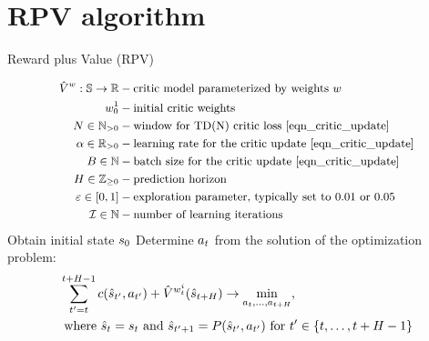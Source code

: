 \documentclass[12pt,twoside]{../../mitthesis}
\begin{document}
\section*{RPV algorithm}
\begin{algorithm}
    \caption{Reward plus Value (RPV)}
    \label{alg:my-alg}
    \begin{algorithmic}[1]
    \begin{equation*}
        \small
        \begin{aligned}
            \hat{V}^w : \mathbb S \to {\mathbb{R}} &- \text{critic model parameterized by weights $w$} \\
            w_0^1 & - \text{initial critic weights} \\
            N \in {\mathbb{N}}_{>0} & - \text{window for TD(N) critic loss \eqref{eqn_critic_update}} \\
            \alpha \in {\mathbb{R}}_{>0}& - \text{learning rate for the critic update \eqref{eqn_critic_update}} \\
            B \in {\mathbb{N}} & - \text{batch size for the critic update \eqref{eqn_critic_update}} \\
            H \in {\mathbb{Z}}_{\geq 0} & - \text{prediction horizon} \\
            \varepsilon \in [0, 1] & - \text{exploration parameter, typically set to 0.01 or 0.05} \\
            \mathcal I \in {\mathbb{N}} & - \text{number of learning iterations}
        \end{aligned}
    \end{equation*}
        \STATE Obtain initial state $s_0$
            \STATE Determine $a_t$ from the solution of the optimization problem:
            $$
            \begin{aligned}
                &\sum_{t'=t}^{t+H-1} c(\hat{s}_{t'}, a_{t'}) + \hat V^{w_t^i}(\hat{s}_{t + H}) \rightarrow \min_{a_t, \dots, a_{t+H}}, \\
                &\text{ where } \hat{s}_t = s_t \text{ and } \hat{s}_{t' + 1} = P(\hat{s}_{t'}, a_{t'}) \text{ for } t' \in \{t, \ldots, t+H-1\}
            \end{aligned}
            $$


\end{algorithmic}
\end{algorithm}
\end{document}
